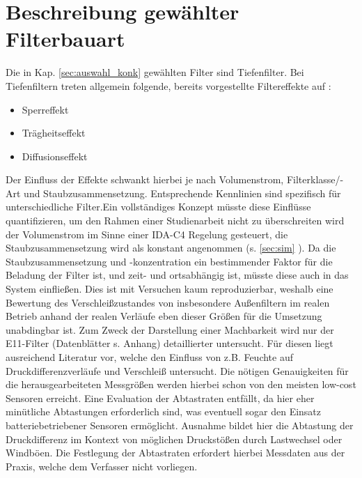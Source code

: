 \section{Beschreibung gewählter Filterbauart}
    Die in Kap. \ref{sec:auswahl_konk} gewählten Filter sind Tiefenfilter.
    Bei Tiefenfiltern treten allgemein folgende, bereits vorgestellte Filtereffekte auf \cite*{transportvorgänge}:
\begin{itemize}
    \item Sperreffekt
    \item Trägheitseffekt
    \item Diffusionseffekt
\end{itemize}
    Der Einfluss der Effekte schwankt hierbei je nach Volumenstrom, Filterklasse/-Art und Staubzusammensetzung. Entsprechende Kennlinien sind spezifisch für unterschiedliche Filter.Ein vollständiges Konzept müsste diese Einflüsse quantifizieren, um den Rahmen einer Studienarbeit nicht zu überschreiten wird der Volumenstrom im Sinne einer IDA-C4 Regelung gesteuert, die Staubzusammensetzung wird als konstant angenommen (s. \ref{sec:sim} ). 
    Da die Staubzusammensetzung und -konzentration ein bestimmender Faktor für die Beladung der Filter ist, und zeit- und ortsabhängig ist, müsste diese auch in das System einfließen. Dies ist mit Versuchen kaum reproduzierbar, weshalb eine Bewertung des Verschleißzustandes von insbesondere Außenfiltern im realen Betrieb anhand der realen Verläufe eben dieser Größen für die Umsetzung unabdingbar ist.
    Zum Zweck der Darstellung einer Machbarkeit wird nur der E11-Filter (Datenblätter s. Anhang) detaillierter untersucht. Für diesen liegt ausreichend Literatur vor, welche den Einfluss von z.B. Feuchte auf Druckdifferenzverläufe und Verschleiß untersucht. Die nötigen Genauigkeiten für die herausgearbeiteten Messgrößen werden hierbei schon von den meisten low-cost Sensoren erreicht. Eine Evaluation der Abtastraten entfällt, da hier eher minütliche Abtastungen erforderlich sind, was eventuell sogar den Einsatz batteriebetriebener Sensoren ermöglicht. Ausnahme bildet hier die Abtastung der Druckdifferenz im Kontext von möglichen Druckstößen durch Lastwechsel oder Windböen. Die Festlegung der Abtastraten erfordert hierbei Messdaten aus der Praxis, welche dem Verfasser nicht vorliegen.
